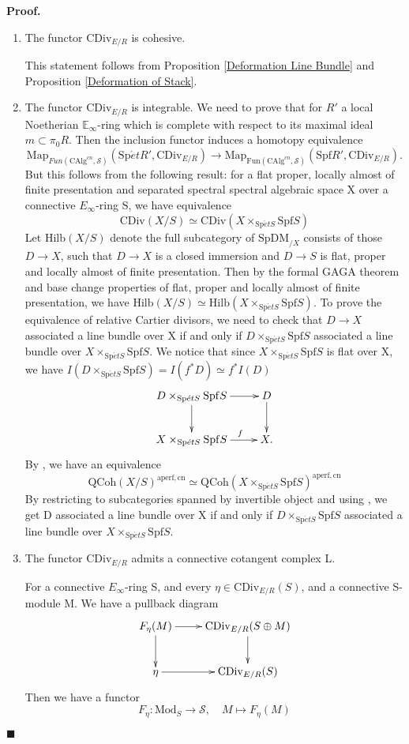 \documentclass[12pt]{article}
\theoremstyle{thry}
\renewenvironment{proof}
{\par \noindent \textbf{Proof.}}
{ \par \hfill $\blacksquare$ \quad \par }
\def  \CAlg     {\mathrm{CAlg}}
\def  \CDiv     {\mathrm{CDiv}}
\def  \Fun      {\mathrm{Fun}}
\def  \Hilb      {\mathrm{Hilb}}
\def  \Mod      {\mathrm{Mod}}
\def  \Map      {\mathrm{Map}}
\def  \QCoh     {\mathrm{QCoh}}
\def  \Spet     {\mathrm{Sp}\acute{e}t}
\def  \Spf      {\mathrm{Spf}}
\def  \SpDM     {\mathrm{SpDM}}
\def  \cs       {\mathcal{S}}
\def  \be       {\mathbb{E}}
\begin{document}
\begin{proof}
\begin{enumerate}
	 \item   The functor $\CDiv_{E/R}$ is cohesive.  
	 
	  This statement  follows  from   Proposition \ref{Deformation Line Bundle} and Proposition \ref{Deformation of Stack}.
	 \item   The functor $\CDiv_{E/R}$ is integrable.
	 We need to prove that for $R'$ a local Noetherian $\be_{\infty}$-ring which is complete with respect to its maximal ideal $m \subset \pi_0 R$. Then the inclusion functor induces  a homotopy equivalence
	 $$
	  \Map_{Fun(\CAlg^{cn},\cs)}(\Spet R', \CDiv_{E/R} ) \to   \Map_{\Fun(\CAlg^{cn},\cs)}(\Spf R', \CDiv_{E/R}).
	 $$
   But this follows from the following result: for a  flat proper, locally almost of finite presentation and separated spectral spectral algebraic space X over a connective $E_{\infty}$-ring S, we have equivalence
   $$
   \CDiv(X/S) \simeq \CDiv(X \times_{\Spet S} \Spf S)
   $$
	Let $\Hilb(X/S)$ denote the  full subcategory of $\SpDM_{/X}$  consists of those $D \to X$, such that $D \to X$ is a closed immersion and $D \to S$ is flat, proper and locally almost of finite presentation.
	 Then by the formal GAGA theorem \cite[Theorem 8.5.3.4]{lu-SAG} and base change properties of flat, proper and locally almost of finite presentation, we have $\Hilb(X/S) \simeq \Hilb(X \times_{\Spet S} \Spf S)$. To prove the equivalence of relative Cartier divisors, we need to check that   $D \to X$ associated a line bundle over X if and only if $D \times_{\Spet S} \Spf S$ associated a line bundle over $X \times_{\Spet S} \Spf S$.  We notice that since $ X \times_{\Spet S} \Spf S$  is flat over X, we have $I (D \times_{\Spet S} \Spf S) = I(f^* D) \simeq f^*I(D) $ 
	 $$
	 \xymatrix{
	 D \times_{\Spet S} \Spf S   \ar[r]  \ar[d]    &  D  \ar[d]  \\
	 X \times_{\Spet S} \Spf S  \ar[r]^{\quad \quad f}    &      X.
	 }
	 $$
	 By \cite[Proposition 19.2.4.7]{lu-SAG}, we have an equivalence
	 $$
	 \QCoh(X/S)^{\mathrm{aperf,cn}}  \simeq  \QCoh(X \times_{\Spet S} \Spf S)^{\mathrm{aperf,cn}}
	 $$
	 By restricting to subcategories spanned by invertible object and using \cite[Proposition 2.9.4.2]{lu-SAG}, we get D  associated a line bundle over X if and only if  $D \times_{\Spet S} \Spf S$ associated a line bundle over $X \times_{\Spet S} \Spf S$.
	 
	 \item   The functor $\CDiv_{E/R}$ admits a connective cotangent complex L.
	  
	  For a connective $E_{\infty}$-ring S,  and every $\eta \in  \CDiv_{E/R}(S)$, and a connective S-module M. We have a pullback diagram
	  $$
	  \xymatrix{
	  	F_{\eta}(M) \ar[r]  \ar[d]  &  \CDiv_{E/R}(S \oplus M)  \ar[d]\\
	  	 \eta  \ar[r]      &     \CDiv_{E/R}(S)
}  
	  $$
	  Then we have a functor
	  $$
	  F_{\eta}: \Mod_S  \to \cs , \quad   M \mapsto F_{\eta}(M) 
	  $$ 	  
	  

\end{enumerate}
\end{proof}
\end{document}
